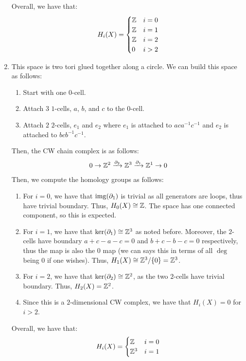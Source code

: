 \documentclass[12pt]{article}
\begin{document}
\begin{solution}
\begin{enumerate}
\begin{enumerate}
        \end{enumerate}
        Overall, we have that:
        \[ H_i(X) = \begin{cases} 
            \mathbb Z & i = 0 \\
            \mathbb Z & i = 1 \\
            \mathbb Z & i = 2 \\
            0 & i > 2
        \end{cases}\]
        \item This space is two tori glued together along a circle. We can build this space as follows: 
        \begin{enumerate}
            \item Start with one $0$-cell. 
            \item Attach $3$ $1$-cells, $a$, $b$, and $c$ to the $0$-cell. 
            \item Attach $2$ $2$-cells, $e_1$ and $e_2$ where $e_1$ is attached to $aca^{-1}c^{-1}$ and $e_2$ is attached to $bcb^{-1}c^{-1}$.
        \end{enumerate}
        Then, the CW chain complex is as follows:
        \[ 0 \to \mathbb Z^2 \xrightarrow{\partial_2} \mathbb Z^3 \xrightarrow{\partial_1} \mathbb Z^1 \to 0\]
        Then, we compute the homology groups as follows:
        \begin{enumerate}
            \item For $i = 0$, we have that $\operatorname{img}(\partial_1)$ is trivial as all generators are loops, thus have trivial boundary. Thus, $H_0(X) \cong \mathbb Z$. The space has one connected component, so this is expected.
            \item For $i = 1$, we have that $\ker(\partial_1) \cong \mathbb Z^3$ as noted before. Moreover, the $2$-cells have boundary $a + c -a -c = 0$ and $b+c-b-c = 0$ respectively, thus the map is also the $0$ map (we can says this in terms of all $\deg$ being $0$ if one wishes). Thus, $H_1(X) \cong \mathbb Z^3/\{0\} = \mathbb Z^3$.
            \item For $i = 2$, we have that $\ker(\partial_2) \cong \mathbb Z^2$, as the two $2$-cells have trivial boundary. Thus, $H_2(X) = \mathbb Z^2$.
            \item Since this is a $2$-dimensional CW complex, we have that $H_i(X) = 0$ for $i > 2$.
        \end{enumerate}
        Overall, we have that:
        \[ H_i(X) = \begin{cases} 
            \mathbb Z & i = 0 \\
            \mathbb Z^3 & i = 1 \\

\end{cases}\]
\end{enumerate}
\end{solution}
\end{document}
